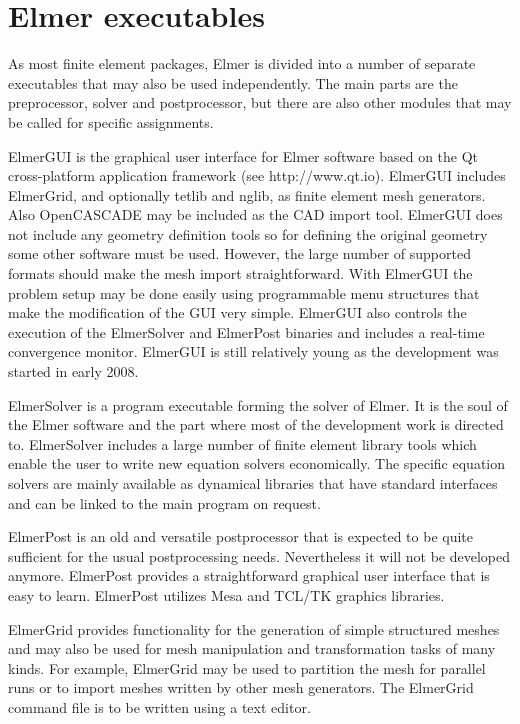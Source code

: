 \section{Elmer executables}

As most finite element packages, Elmer is divided into a number of separate
executables that may also be used independently. The main parts are the preprocessor, solver
and postprocessor, but there are also other modules that may be called for specific assignments. 

\sifbegin
{}
ElmerGUI is the graphical user interface for Elmer software
based on the Qt cross-platform application framework (see http://www.qt.io). 
ElmerGUI includes ElmerGrid, and optionally tetlib and nglib,
as finite element mesh generators. Also OpenCASCADE may be included as the CAD import tool.
ElmerGUI does not include any geometry definition tools so for defining the 
original geometry some other software must be used. However, the large number of supported formats should make
the mesh import straightforward. With ElmerGUI the problem setup may be done easily using programmable 
menu structures that make the modification of the GUI very simple. ElmerGUI also controls the execution of the ElmerSolver and 
ElmerPost binaries and includes a real-time convergence monitor. ElmerGUI is still relatively young 
as the development was started in early 2008. 


ElmerSolver is a program executable forming the solver of Elmer. 
It is the soul of the Elmer software and the part where most of the development work is 
directed to. ElmerSolver includes a large number of finite element library tools
which enable the user to write new equation solvers economically. The specific equation
solvers are mainly available as dynamical libraries that have standard interfaces and can
be linked to the main program on request. 

ElmerPost is an old and versatile postprocessor that is expected to be quite sufficient for the 
usual postprocessing needs. Nevertheless it will not be developed anymore.
ElmerPost provides a straightforward graphical user interface 
that is easy to learn. ElmerPost utilizes Mesa and TCL/TK graphics libraries. 

ElmerGrid provides functionality for the generation of simple structured meshes and may also be used 
for mesh manipulation and transformation tasks of many kinds. For example, ElmerGrid may be used
to partition the mesh for parallel runs or to import meshes written by other mesh generators. 
The ElmerGrid command file is to be written using a text editor. 

